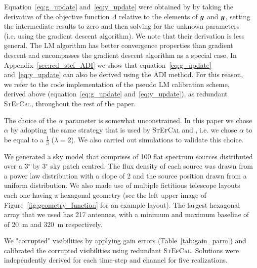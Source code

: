 \documentclass[useAMS,usenatbib]{mn2e}
\newcommand{\bg}{\bmath{g}}
\newcommand{\by}{\bmath{y}}
\begin{document}
Equation~\ref{eq:g_update} and~\ref{eq:y_update} were obtained by \citet{Marthi2014} by taking the derivative of the objective function $\Lambda$ relative to the elements of $\bg$ and $\by$, setting the intermediate results to zero and then solving for the unknown parameters (i.e. using the gradient descent algorithm). 
We note that their derivation is less general. The LM algorithm has better convergence properties than gradient descent and 
encompasses the gradient descent algorithm as a special case. In Appendix~\ref{sec:red_stef_ADI} we show that equation~\ref{eq:g_update} and~\ref{eq:y_update} can also be derived using the ADI method. 
For this reason, we refer to the code implementation of the pseudo LM calibration scheme, derived above (equation~\ref{eq:g_update} and~\ref{eq:y_update}), as redundant \textsc{StEfCal}, throughout the rest of the paper.

The choice of the $\alpha$ parameter is somewhat unconstrained. In this paper we chose $\alpha$ by adopting the same strategy that is used by \textsc{StEfCal} and \citet{Marthi2014},
i.e. we chose $\alpha$ to be equal to a $\frac{1}{3}$ ($\lambda = 2$). We also carried out simulations to validate this choice.

We generated a sky model that comprises of 100 flat spectrum sources distributed over a 3$^{\circ}$ by 3$^{\circ}$ sky 
patch centred. The flux density of each source was drawn from a power law distribution with a slope of 2 and the source position drawn from a uniform distribution. 
We also made use of multiple fictitious telescope layouts each one having a hexagonal geometry (see the left upper image of Figure~\ref{fig:geometry_function} for an example layout). The largest hexagonal array that we used has 217 antennas, with a minimum and maximum baseline of of 20~m and 320~m respectively.

We "corrupted" visibilities by applying gain errors (Table~\ref{tab:gain_parm}) and calibrated the corrupted visibilities using redundant \textsc{StEfCal}. Solutions were independently derived for each time-step and channel for five realizations. 
\end{document}
